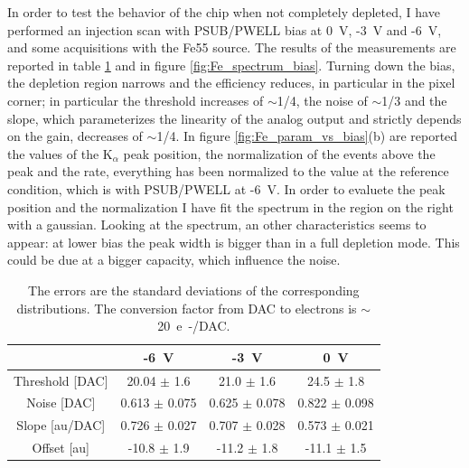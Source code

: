         In order to test the behavior of the chip when not completely depleted, I have performed an injection scan with PSUB/PWELL bias at \SI{0}{V}, -\SI{3}{V} and -\SI{6}{V}, and some acquisitions with the Fe55 source.
        The results of the measurements are reported in table \ref{tab:parameters_vs_bias} and in figure \ref{fig:Fe_spectrum_bias}.
        Turning down the bias, the depletion region narrows and the efficiency reduces, in particular in the pixel corner; in particular the threshold increases of $\sim$1/4, the noise of $\sim$1/3 and the slope, which parameterizes the linearity of the analog output and strictly depends on the gain, decreases of $\sim$1/4.
        In figure \ref{fig:Fe_param_vs_bias}(b) are reported the values of the K$_\alpha$ peak position, the normalization of the events above the peak and the rate, everything has been normalized to the value at the reference condition, which is with PSUB/PWELL at -\SI{6}{V}. 
        In order to evaluete the peak position and the normalization I have fit the spectrum in the region on the right with a gaussian.
        Looking at the spectrum, an other characteristics seems to appear: at lower bias the peak width is bigger than in a full depletion mode.
        This could be due at a bigger capacity, which influence the noise.         
    \begin{table}
            \begin{center}
            \begin{tabular}{| c |  c | c | c |}
            \hline
               & -\SI{6}{V} & -\SI{3}{V} & \SI{0}{V}\\
            \hline
            \hline
            Threshold [DAC] & 20.04 $\pm$ 1.6 & 21.0 $\pm$ 1.6 & 24.5 $\pm$ 1.8\\
            Noise [DAC] & 0.613 $\pm$ 0.075 & 0.625 $\pm$ 0.078 & 0.822 $\pm$ 0.098\\
            Slope [au/DAC] & 0.726 $\pm$ 0.027 & 0.707 $\pm$ 0.028  & 0.573 $\pm$ 0.021\\
            Offset [au] & -10.8 $\pm$ 1.9 & -11.2 $\pm$ 1.8 & -11.1 $\pm$ 1.5 \\
            \hline
            \end{tabular}
            \caption{The errors are the standard deviations of the corresponding distributions. The conversion factor from DAC to electrons is $\sim$\SI{20}{e-/DAC}.}
            \label{tab:parameters_vs_bias}
            \end{center}
        \end{table}  
        

